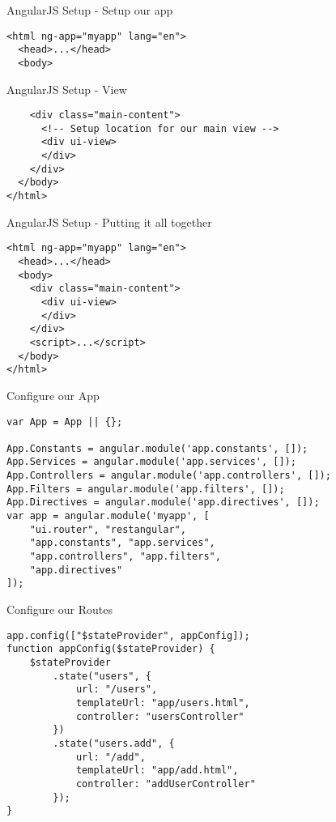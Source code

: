 \documentclass[presentation]{beamer}
\begin{document}
\begin{frame}[fragile,label=sec-2-2]{AngularJS Setup - Setup our app}
 \begin{verbatim}
<html ng-app="myapp" lang="en">
  <head>...</head>
  <body>
\end{verbatim}
\end{frame}

\begin{frame}[fragile,label=sec-2-3]{AngularJS Setup - View}
 \begin{verbatim}
    <div class="main-content">
      <!-- Setup location for our main view -->
      <div ui-view>
      </div>
    </div>
  </body>
</html>
\end{verbatim}
\end{frame}

\begin{frame}[fragile,label=sec-2-4]{AngularJS Setup - Putting it all together}
 \begin{verbatim}
<html ng-app="myapp" lang="en">
  <head>...</head>
  <body>
    <div class="main-content">
      <div ui-view>
      </div>
    </div>
    <script>...</script>
  </body>
</html>
\end{verbatim}
\end{frame}

\begin{frame}[fragile,label=sec-2-5]{Configure our App}
 \begin{verbatim}
var App = App || {};

App.Constants = angular.module('app.constants', []);
App.Services = angular.module('app.services', []);
App.Controllers = angular.module('app.controllers', []);
App.Filters = angular.module('app.filters', []);
App.Directives = angular.module('app.directives', []);
var app = angular.module('myapp', [
    "ui.router", "restangular",
    "app.constants", "app.services",
    "app.controllers", "app.filters",
    "app.directives"
]);
\end{verbatim}
\end{frame}

\begin{frame}[fragile,label=sec-2-6]{Configure our Routes}
 \begin{verbatim}
app.config(["$stateProvider", appConfig]);
function appConfig($stateProvider) {
    $stateProvider
        .state("users", {
            url: "/users",
            templateUrl: "app/users.html",
            controller: "usersController"
        })
        .state("users.add", {
            url: "/add",
            templateUrl: "app/add.html",
            controller: "addUserController"
        });
}
\end{verbatim}
\end{frame}
\end{document}
